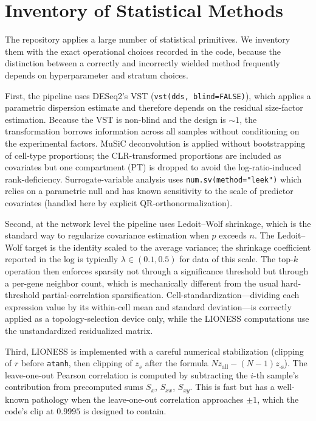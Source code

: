 \documentclass[11pt]{article}
\newcommand{\code}[1]{\texttt{#1}}
\begin{document}
\section{Inventory of Statistical Methods}

The repository applies a large number of statistical primitives. We inventory them with the exact operational choices recorded in the code, because the distinction between a correctly and incorrectly wielded method frequently depends on hyperparameter and stratum choices.

First, the pipeline uses DESeq2's VST (\code{vst(dds, blind=FALSE)}), which applies a parametric dispersion estimate and therefore depends on the residual size-factor estimation. Because the VST is non-blind and the design is $\sim 1$, the transformation borrows information across all samples without conditioning on the experimental factors. MuSiC deconvolution is applied without bootstrapping of cell-type proportions; the CLR-transformed proportions are included as covariates but one compartment (PT) is dropped to avoid the log-ratio-induced rank-deficiency. Surrogate-variable analysis uses \code{num.sv(method="leek")} which relies on a parametric null and has known sensitivity to the scale of predictor covariates (handled here by explicit QR-orthonormalization).

Second, at the network level the pipeline uses Ledoit--Wolf shrinkage, which is the standard way to regularize covariance estimation when $p$ exceeds $n$. The Ledoit--Wolf target is the identity scaled to the average variance; the shrinkage coefficient reported in the log is typically $\lambda \in (0.1, 0.5)$ for data of this scale. The top-$k$ operation then enforces sparsity not through a significance threshold but through a per-gene neighbor count, which is mechanically different from the usual hard-threshold partial-correlation sparsification. Cell-standardization---dividing each expression value by its within-cell mean and standard deviation---is correctly applied as a topology-selection device only, while the LIONESS computations use the unstandardized residualized matrix.

Third, LIONESS is implemented with a careful numerical stabilization (clipping of $r$ before \code{atanh}, then clipping of $z_s$ after the formula $N z_{\text{all}} - (N-1) z_{\text{-s}}$). The leave-one-out Pearson correlation is computed by subtracting the $i$-th sample's contribution from precomputed sums $S_x$, $S_{xx}$, $S_{xy}$. This is fast but has a well-known pathology when the leave-one-out correlation approaches $\pm 1$, which the code's clip at $0.9995$ is designed to contain.
\end{document}
